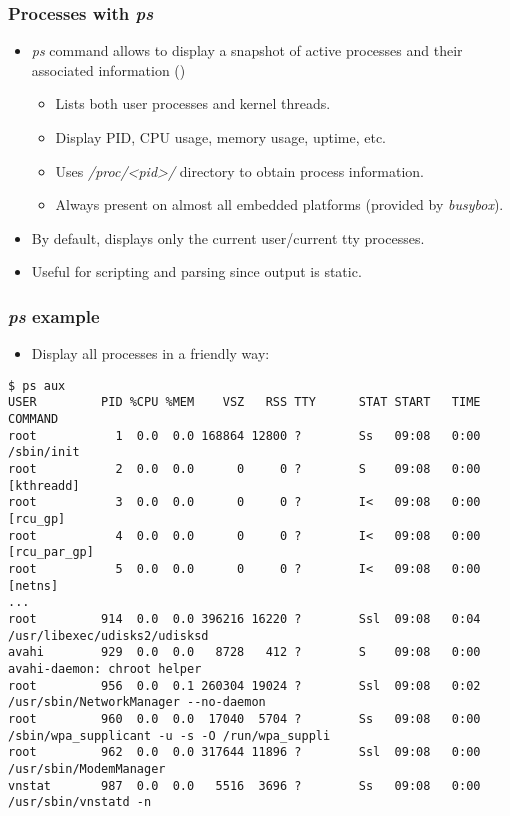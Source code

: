 \begin{frame}[fragile]
  \frametitle{Processes with {\em ps}}
  \begin{itemize}
    \item {\em ps} command allows to display a snapshot of active processes and
          their associated information ()
    \begin{itemize}
      \item Lists both user processes and kernel threads.
      \item Display PID, CPU usage, memory usage, uptime, etc.
    \end{itemize}
    \begin{itemize}
      \item Uses {\em /proc/<pid>/} directory to obtain process information.
      \item Always present on almost all embedded platforms (provided by
            {\em busybox}).
    \end{itemize}
    \item By default, displays only the current user/current tty processes.
    \item Useful for scripting and parsing since output is static.
  \end{itemize}
\end{frame}

\begin{frame}[fragile]
  \frametitle{{\em ps} example}
  \begin{itemize}
  \frametitle{Processes with {\em ps}}
    \item Display all processes in a friendly way:
  \end{itemize}
  \begin{block}{}
    \begin{verbatim}
$ ps aux
USER         PID %CPU %MEM    VSZ   RSS TTY      STAT START   TIME COMMAND
root           1  0.0  0.0 168864 12800 ?        Ss   09:08   0:00 /sbin/init
root           2  0.0  0.0      0     0 ?        S    09:08   0:00 [kthreadd]
root           3  0.0  0.0      0     0 ?        I<   09:08   0:00 [rcu_gp]
root           4  0.0  0.0      0     0 ?        I<   09:08   0:00 [rcu_par_gp]
root           5  0.0  0.0      0     0 ?        I<   09:08   0:00 [netns]
...
root         914  0.0  0.0 396216 16220 ?        Ssl  09:08   0:04 /usr/libexec/udisks2/udisksd
avahi        929  0.0  0.0   8728   412 ?        S    09:08   0:00 avahi-daemon: chroot helper
root         956  0.0  0.1 260304 19024 ?        Ssl  09:08   0:02 /usr/sbin/NetworkManager --no-daemon
root         960  0.0  0.0  17040  5704 ?        Ss   09:08   0:00 /sbin/wpa_supplicant -u -s -O /run/wpa_suppli
root         962  0.0  0.0 317644 11896 ?        Ssl  09:08   0:00 /usr/sbin/ModemManager
vnstat       987  0.0  0.0   5516  3696 ?        Ss   09:08   0:00 /usr/sbin/vnstatd -n
    \end{verbatim}
  \end{block}
\end{frame}


